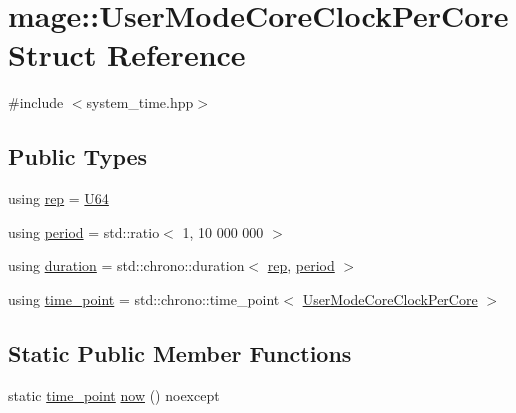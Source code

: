 \hypertarget{structmage_1_1_user_mode_core_clock_per_core}{}\section{mage\+:\+:User\+Mode\+Core\+Clock\+Per\+Core Struct Reference}
\label{structmage_1_1_user_mode_core_clock_per_core}


{\ttfamily \#include $<$system\+\_\+time.\+hpp$>$}

\subsection*{Public Types}
\begin{DoxyCompactItemize}
\item 
using \hyperlink{structmage_1_1_user_mode_core_clock_per_core_a287b38a7811aa8bb1a1829ac316acd09}{rep} = \hyperlink{namespacemage_a6672cf3c861707ce4a3235a3eb43941d}{U64}
\item 
using \hyperlink{structmage_1_1_user_mode_core_clock_per_core_ad34694d282d2fdbdf1f09b4a49ae7416}{period} = std\+::ratio$<$ 1, 10 \textquotesingle{}000 \textquotesingle{}000 $>$
\item 
using \hyperlink{structmage_1_1_user_mode_core_clock_per_core_a55aa3108b2d755c6b8df89ba37585fbb}{duration} = std\+::chrono\+::duration$<$ \hyperlink{structmage_1_1_user_mode_core_clock_per_core_a287b38a7811aa8bb1a1829ac316acd09}{rep}, \hyperlink{structmage_1_1_user_mode_core_clock_per_core_ad34694d282d2fdbdf1f09b4a49ae7416}{period} $>$
\item 
using \hyperlink{structmage_1_1_user_mode_core_clock_per_core_a52312b09168e0f4a8cace07d94be5427}{time\+\_\+point} = std\+::chrono\+::time\+\_\+point$<$ \hyperlink{structmage_1_1_user_mode_core_clock_per_core}{User\+Mode\+Core\+Clock\+Per\+Core} $>$
\end{DoxyCompactItemize}
\subsection*{Static Public Member Functions}
\begin{DoxyCompactItemize}
\item 
static \hyperlink{structmage_1_1_user_mode_core_clock_per_core_a52312b09168e0f4a8cace07d94be5427}{time\+\_\+point} \hyperlink{structmage_1_1_user_mode_core_clock_per_core_aa708031155400391c8b35ad206bd70b4}{now} () noexcept
\end{DoxyCompactItemize}
